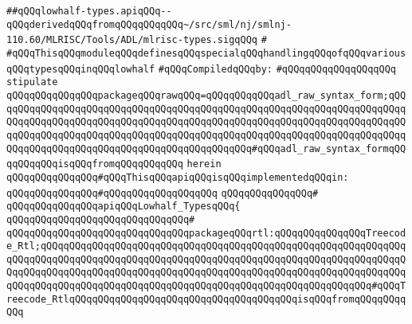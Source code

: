 \label{src/lib/compiler/back/low/tools/arch/lowhalf-types.api}
\verb|##qQQqlowhalf-types.apiqQQq--qQQqderivedqQQqfromqQQqqQQqqQQq~/src/sml/nj/smlnj-110.60/MLRISC/Tools/ADL/mlrisc-types.sigqQQq|\newline
\verb|#|\newline
\verb|#qQQqThisqQQqmoduleqQQqdefinesqQQqspecialqQQqhandlingqQQqofqQQqvariousqQQqtypesqQQqinqQQqlowhalf|\newline
\newline
\verb|#qQQqCompiledqQQqby:|\newline
\verb|#qQQqqQQqqQQqqQQqqQQq|\newline
\newline
\verb|stipulate|\newline
\verb|qQQqqQQqqQQqqQQqpackageqQQqrawqQQq=qQQqqQQqqQQqadl_raw_syntax_form;qQQqqQQqqQQqqQQqqQQqqQQqqQQqqQQqqQQqqQQqqQQqqQQqqQQqqQQqqQQqqQQqqQQqqQQqqQQqqQQqqQQqqQQqqQQqqQQqqQQqqQQqqQQqqQQqqQQqqQQqqQQqqQQqqQQqqQQqqQQqqQQqqQQqqQQqqQQqqQQqqQQqqQQqqQQqqQQqqQQqqQQqqQQqqQQqqQQqqQQqqQQqqQQqqQQqqQQqqQQqqQQqqQQqqQQqqQQqqQQqqQQqqQQqqQQqqQQq#qQQqadl_raw_syntax_formqQQqqQQqqQQqisqQQqfromqQQqqQQqqQQq|\newline
\verb|herein|\newline
\newline
\verb|qQQqqQQqqQQqqQQq#qQQqThisqQQqapiqQQqisqQQqimplementedqQQqin:|\newline
\verb|qQQqqQQqqQQqqQQq#qQQqqQQqqQQqqQQqqQQq|\newline
\verb|qQQqqQQqqQQqqQQq#|\newline
\verb|qQQqqQQqqQQqqQQqapiqQQqLowhalf_TypesqQQq{|\newline
\verb|qQQqqQQqqQQqqQQqqQQqqQQqqQQqqQQq#|\newline
\verb|qQQqqQQqqQQqqQQqqQQqqQQqqQQqqQQqpackageqQQqrtl:qQQqqQQqqQQqqQQqTreecode_Rtl;qQQqqQQqqQQqqQQqqQQqqQQqqQQqqQQqqQQqqQQqqQQqqQQqqQQqqQQqqQQqqQQqqQQqqQQqqQQqqQQqqQQqqQQqqQQqqQQqqQQqqQQqqQQqqQQqqQQqqQQqqQQqqQQqqQQqqQQqqQQqqQQqqQQqqQQqqQQqqQQqqQQqqQQqqQQqqQQqqQQqqQQqqQQqqQQqqQQqqQQqqQQqqQQqqQQqqQQqqQQqqQQqqQQqqQQqqQQqqQQqqQQqqQQqqQQqqQQqqQQqqQQqqQQq#qQQqTreecode_RtlqQQqqQQqqQQqqQQqqQQqqQQqqQQqqQQqqQQqqQQqisqQQqfromqQQqqQQqqQQq|\newline
